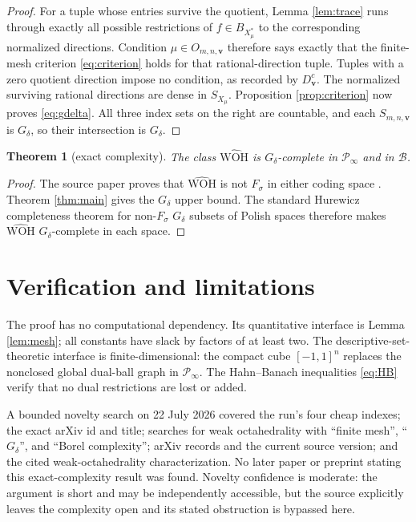 \documentclass[11pt]{article}
\newtheorem{theorem}{Theorem}
\newcommand{\Bcal}{\mathcal B}
\newcommand{\Pinf}{\mathcal P_\infty}
\newcommand{\WOH}{\widehat{\mathrm{WOH}}}
\begin{document}
\begin{proof}
For a tuple whose entries survive the quotient, Lemma \ref{lem:trace}
runs through exactly all possible restrictions of $f\in B_{X_\mu^*}$ to
the corresponding normalized directions.  Condition
$\mu\in O_{m,n,\mathbf v}$ therefore says exactly that the finite-mesh
criterion \eqref{eq:criterion} holds for that rational-direction tuple.
Tuples with a zero quotient direction impose no condition, as recorded by
$D_{\mathbf v}^{c}$.  The normalized surviving rational directions are
dense in $S_{X_\mu}$.  Proposition \ref{prop:criterion} now proves
\eqref{eq:gdelta}.  All three index sets on the right are countable, and
each $S_{m,n,\mathbf v}$ is $G_\delta$, so their intersection is
$G_\delta$.
\end{proof}

\begin{theorem}[exact complexity]\label{thm:complete}
The class $\WOH$ is $G_\delta$-complete in $\Pinf$ and in $\Bcal$.
\end{theorem}

\begin{proof}
The source paper proves that $\WOH$ is not $F_\sigma$ in either coding space
\cite[Proposition 3.3]{source}.  Theorem \ref{thm:main} gives the
$G_\delta$ upper bound.  The standard Hurewicz completeness theorem for
non-$F_\sigma$ $G_\delta$ subsets of Polish spaces
\cite[Theorem 22.11]{Kechris} therefore makes $\WOH$
$G_\delta$-complete in each space.
\end{proof}

\section{Verification and limitations}

The proof has no computational dependency.  Its quantitative interface is
Lemma \ref{lem:mesh}; all constants have slack by factors of at least two.
The descriptive-set-theoretic interface is finite-dimensional: the compact
cube $[-1,1]^n$ replaces the nonclosed global dual-ball graph in $\Pinf$.
The Hahn--Banach inequalities \eqref{eq:HB} verify that no dual restrictions
are lost or added.

A bounded novelty search on 22 July 2026 covered the run's four cheap
indexes; the exact arXiv id and title; searches for weak octahedrality with
``finite mesh'', ``$G_\delta$'', and ``Borel complexity''; arXiv records and
the current source version; and the cited weak-octahedrality
characterization.  No later paper or preprint stating this exact-complexity
result was found.  Novelty confidence is moderate: the argument is short and
may be independently accessible, but the source explicitly leaves the
complexity open and its stated obstruction is bypassed here.
\end{document}
